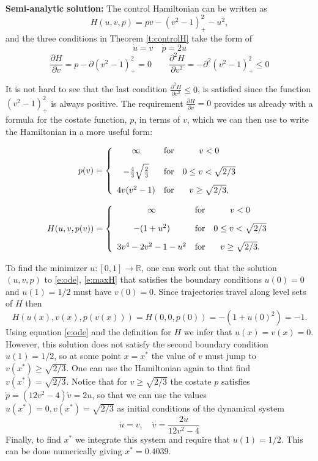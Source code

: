\documentclass[11pt]{article}
\newcommand{\R}{\mathbb{R}}
\theoremstyle{plain}
\begin{document}
{\bf Semi-analytic solution:} The control Hamiltonian can be written as
\[ H(u,v,p) = pv - (v^2-1)^2_+ - u^2,\] 
and the three conditions in Theorem \ref{t:controlH}  take the form of
\begin{equation}\label{e:ode}
 \dot{u} = v \quad \dot{p} = 2u
 \end{equation}
 \begin{equation}\label{e:maxH}
\frac{\partial H}{\partial v}= p - \partial(v^2-1)^2_+ =0 \qquad \frac{\partial^2 H}{\partial v^2} =- \partial^2(v^2-1)^2_+\leq 0
\end{equation}

It is not hard to see that the last condition $\frac{\partial^2 H}{\partial v^2}\leq 0$, is satisfied since the function $(v^2-1)^2_+$ is always positive. The requirement $\frac{\partial H}{\partial v}=0$ provides us already with a formula for the costate function, $p$, in terms of $v$, which we can then use to write the Hamiltonian in a more useful form:


\[ p(v) = \left \{ \begin{array}{c c c}
\infty & \mbox{for} & v<0\\[2ex]
-\frac{4}{3}\sqrt{\frac{2}{3}}& \mbox{for} & 0\leq v < \sqrt{2/3}\\[2ex]
4v(v^2-1) & \mbox{for} & v \geq \sqrt{2/3},
\end{array} \right.\]

\[H(u,v,p(v))  = \left \{ \begin{array}{c c c}
\infty & \mbox{for} & v<0\\[2ex]
-(1+u^2) & \mbox{for} & 0\leq v < \sqrt{2/3}\\[2ex]
3v^4-2v^2-1-u^2 & \mbox{for} & v \geq \sqrt{2/3}.
\end{array} \right.\]


To find the minimizer $u:[0,1] \rightarrow \R$, one can work out that the solution $(u,v,p)$ to \eqref{e:ode}, \eqref{e:maxH} that satisfies the boundary conditions $u(0) = 0$ and $u(1)=1/2$ must have $v(0) =0$. Since trajectories travel along level sets of $H$ then  $$H(u(x),v(x),p(v(x))) = H(0,0,p(0)) = -(1+u(0)^2)=-1.$$ Using equation \eqref{e:ode} and the definition for $H$ we infer that $u(x)=v(x)=0$. However, this solution does not satisfy the second boundary condition $u(1)=1/2$, so at some point $x =x^*$ the value of $v$ must jump to $v(x^*)\geq \sqrt{2/3}$. One can use the Hamiltonian again to that find $v(x^*) = \sqrt{2/3}$. Notice that for $v\geq \sqrt{2/3}$ the costate $p$ satisfies $\dot{p} = (12v^2-4)\dot{v} =2u$, so that we can use the values $u(x^*)=0, v(x^*) = \sqrt{2/3}$ as initial conditions of the dynamical system
\[ \dot{u} =v, \quad \dot{v} = \frac{2u}{12v^2-4}\]
Finally, to find $x^*$ we integrate this system and require that $u(1)=1/2$. This can be done numerically giving $x^* = 0.4039$. 
\end{document}
